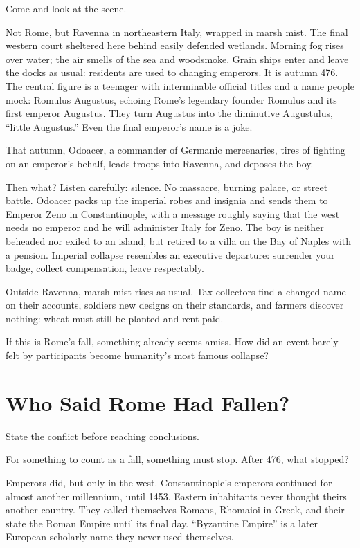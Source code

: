 Come and look at the scene.

Not Rome, but Ravenna in northeastern Italy, wrapped in marsh mist. The final western court sheltered here behind easily defended wetlands. Morning fog rises over water; the air smells of the sea and woodsmoke. Grain ships enter and leave the docks as usual: residents are used to changing emperors. It is autumn 476. The central figure is a teenager with interminable official titles and a name people mock: Romulus Augustus, echoing Rome's legendary founder Romulus and its first emperor Augustus. They turn Augustus into the diminutive Augustulus, ``little Augustus.'' Even the final emperor's name is a joke.

That autumn, Odoacer, a commander of Germanic mercenaries, tires of fighting on an emperor's behalf, leads troops into Ravenna, and deposes the boy.

Then what? Listen carefully: silence. No massacre, burning palace, or street battle. Odoacer packs up the imperial robes and insignia and sends them to Emperor Zeno in Constantinople, with a message roughly saying that the west needs no emperor and he will administer Italy for Zeno. The boy is neither beheaded nor exiled to an island, but retired to a villa on the Bay of Naples with a pension. Imperial collapse resembles an executive departure: surrender your badge, collect compensation, leave respectably.

Outside Ravenna, marsh mist rises as usual. Tax collectors find a changed name on their accounts, soldiers new designs on their standards, and farmers discover nothing: wheat must still be planted and rent paid.

If this is Rome's fall, something already seems amiss. How did an event barely felt by participants become humanity's most famous collapse?

\section{Who Said Rome Had Fallen?}
State the conflict before reaching conclusions.

For something to count as a fall, something must stop. After 476, what stopped?

Emperors did, but only in the west. Constantinople's emperors continued for almost another millennium, until 1453. Eastern inhabitants never thought theirs another country. They called themselves Romans, Rhomaioi in Greek, and their state the Roman Empire until its final day. ``Byzantine Empire'' is a later European scholarly name they never used themselves.

